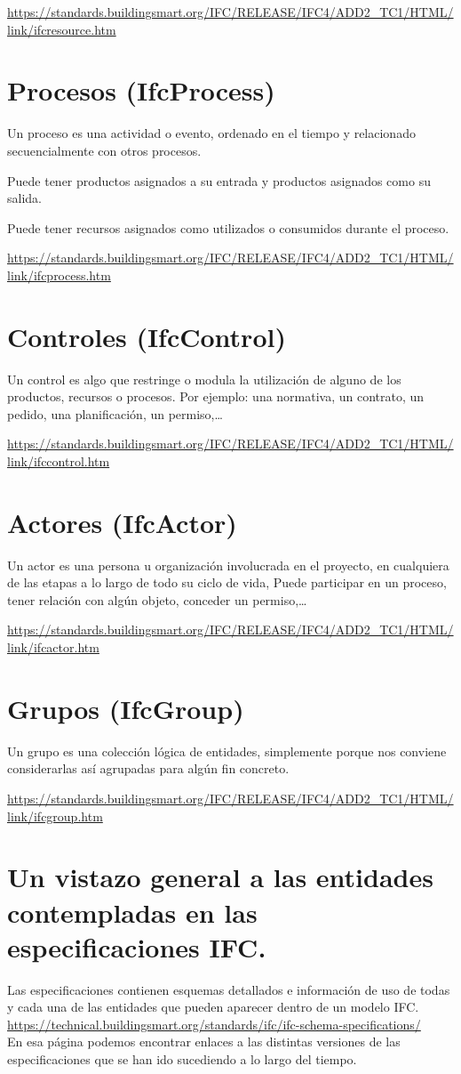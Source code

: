 \documentclass[spanish,12pt,a4paper,final,oneside]{book}
\begin{document}
\url{https://standards.buildingsmart.org/IFC/RELEASE/IFC4/ADD2_TC1/HTML/link/ifcresource.htm}

 
\section{Procesos (IfcProcess)}
Un proceso es una actividad o evento, ordenado en el tiempo y relacionado secuencialmente con otros procesos.

Puede tener productos asignados a su entrada y productos asignados como su salida.

Puede tener recursos asignados como utilizados o consumidos durante el proceso.

\url{https://standards.buildingsmart.org/IFC/RELEASE/IFC4/ADD2_TC1/HTML/link/ifcprocess.htm}


\section{Controles (IfcControl)}
Un control es algo que restringe o modula la utilización de alguno de los productos, recursos o procesos. Por ejemplo: una normativa, un contrato, un pedido, una planificación, un permiso,\ldots

\url{https://standards.buildingsmart.org/IFC/RELEASE/IFC4/ADD2_TC1/HTML/link/ifccontrol.htm}


\section{Actores (IfcActor)}
Un actor es una persona u organización involucrada en el proyecto, en cualquiera de las etapas a lo largo de todo su ciclo de vida, Puede participar en un proceso, tener relación con algún objeto, conceder un permiso,\ldots

\url{https://standards.buildingsmart.org/IFC/RELEASE/IFC4/ADD2_TC1/HTML/link/ifcactor.htm}

\section{Grupos (IfcGroup)}
Un grupo es una colección lógica de entidades, simplemente porque nos conviene considerarlas así agrupadas para algún fin concreto.

\url{https://standards.buildingsmart.org/IFC/RELEASE/IFC4/ADD2_TC1/HTML/link/ifcgroup.htm}


\section{Un vistazo general a las entidades contempladas en las especificaciones IFC.}
Las especificaciones contienen esquemas detallados e información de uso de todas y cada una de las entidades que pueden aparecer dentro de un modelo IFC.
\\ \url{https://technical.buildingsmart.org/standards/ifc/ifc-schema-specifications/}
\\En esa página podemos encontrar enlaces a las distintas versiones de las especificaciones que se han ido sucediendo a lo largo del tiempo.
\end{document}
